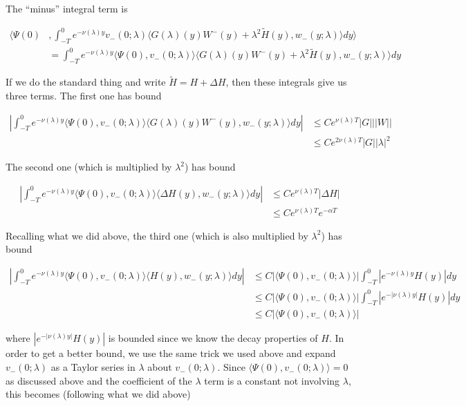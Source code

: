 \documentclass[12pt]{article}
\begin{document}
\begin{enumerate}
The ``minus'' integral term is

\begin{align*}
\langle \Psi(0) &, \int_{-T}^0 
e^{-\nu(\lambda)y} v_-(0; \lambda) \langle G(\lambda)(y)W^-(y) + \lambda^2 \tilde{H}(y), w_-(y; \lambda) \rangle dy \rangle \\
&= \int_{-T}^0 e^{-\nu(\lambda)y} \langle \Psi(0),v_-(0; \lambda) \rangle
\langle G(\lambda)(y)W^-(y) + \lambda^2 \tilde{H}(y), w_-(y; \lambda) \rangle dy 
\end{align*}

If we do the standard thing and write $\tilde{H} = H + \Delta H$, then these integrals give us three terms. The first one has bound

\begin{align*}
\left| \int_{-T}^0 e^{-\nu(\lambda)y} \langle \Psi(0),v_-(0; \lambda) \rangle
\langle G(\lambda)(y)W^-(y), w_-(y; \lambda) \rangle dy \right| 
&\leq C e^{\nu(\lambda)T} |G| ||W|| \\
&\leq C e^{2\nu(\lambda)T} |G| |\lambda|^2
\end{align*}

The second one (which is multiplied by $\lambda^2$) has bound

\begin{align*}
\left| \int_{-T}^0 e^{-\nu(\lambda)y} \langle \Psi(0), v_-(0; \lambda) \rangle
\langle \Delta H(y), w_-(y; \lambda) \rangle dy \right| 
&\leq C e^{\nu(\lambda)T} |\Delta H| \\
&\leq C e^{\nu(\lambda)T} e^{-\alpha T}
\end{align*}

Recalling what we did above, the third one (which is also multiplied by $\lambda^2$) has bound

\begin{align*}
\left| \int_{-T}^0 e^{-\nu(\lambda)y} \langle \Psi(0), v_-(0; \lambda) \rangle
\langle H(y), w_-(y; \lambda) \rangle dy \right| 
&\leq C |\langle \Psi(0), v_-(0; \lambda) \rangle| \int_{-T}^0 |e^{-\nu(\lambda)y} H(y)|dy\\
&\leq C |\langle \Psi(0), v_-(0; \lambda) \rangle| \int_{-T}^0 |e^{-|\nu(\lambda)y|} H(y)|dy\\
&\leq C |\langle \Psi(0), v_-(0; \lambda) \rangle|
\end{align*}

where $|e^{-|\nu(\lambda)y|} H(y)|$ is bounded since we know the decay properties of $H$. In order to get a better bound, we use the same trick we used above and expand $v_-(0; \lambda)$ as a Taylor series in $\lambda$ about $v_-(0; \lambda)$. Since $\langle \Psi(0), v_-(0; \lambda) \rangle = 0$ as discussed above and the coefficient of the $\lambda$ term is a constant not involving $\lambda$, this becomes (following what we did above)


\end{enumerate}
\end{document}
